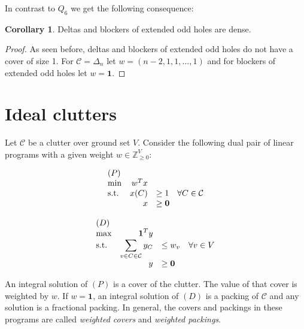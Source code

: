 \documentclass[a4paper, 12pt]{scrbook}
\theoremstyle{definition}
\newtheorem{corollary}[theorem]{Corollary}
\newcommand*{\IZ}{\ensuremath{\mathbb{Z}}}
\begin{document}
In contrast to $Q_6$ we get the following consequence:
\begin{corollary}
    Deltas and blockers of extended odd holes are dense.
\end{corollary}

\begin{proof}
    As seen before, deltas and blockers of extended odd holes do not have a cover of size 1.
    For $\mathcal{C}=\Delta_n$ let $w=(n-2,1,1,\ldots,1)$ and for blockers of extended odd holes let $w=\textbf{1}$.
\end{proof}

\section{Ideal clutters}
Let $\mathcal{C}$ be a clutter over ground set $V$. Consider the following dual pair of linear programs with a given weight $w \in \IZ^V_{\geq 0}$:
\newline
\newline
    \begin{minipage}{.5\linewidth}
        \begin{equation*}
            \begin{array}{l@{\quad} r l l}
                (P)\\
                \min          &w^Tx   \\
                \mathrm{s.t.}  &x(C) &\geq  1 \quad \forall C \in \mathcal{C} \\
                    &   x &\geq   \textbf{0}
            \end{array}
        \end{equation*}
    \end{minipage}
    \begin{minipage}{.5\linewidth}
        \begin{equation*}
            \begin{array}{l@{\quad} r l l}
                (D)\\
                \max          &\textbf{1}^Ty   \\
                \mathrm{s.t.}  &\displaystyle\sum\limits_{v \in C \in \mathcal{C}} y_C &\leq  w_v \quad \forall v \in V \\
                    &   y &\geq   \textbf{0}
            \end{array}
        \end{equation*}
    \end{minipage}
   \newline
   \newline
   An integral solution of $(P)$ is a cover of the clutter. The value of that cover is weighted by $w$. If $w=\textbf{1}$, an integral solution of $(D)$ is a packing of $\mathcal{C}$ and any solution is a fractional packing.
   In general, the covers and packings in these programs are called \emph{weighted covers} and \emph{weighted packings}.
\end{document}

